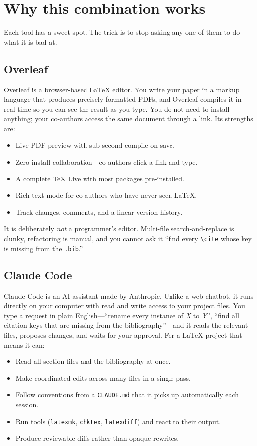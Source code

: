 \section{Why this combination works}
\label{sec:why}

Each tool has a sweet spot. The trick is to stop asking any one of them to do what it is bad at.

\subsection{Overleaf}
Overleaf is a browser-based \LaTeX{} editor. You write your paper in a markup language that produces precisely formatted PDFs, and Overleaf compiles it in real time so you can see the result as you type. You do not need to install anything; your co-authors access the same document through a link. Its strengths are:
\begin{itemize}[leftmargin=*]
  \item Live PDF preview with sub-second compile-on-save.
  \item Zero-install collaboration---co-authors click a link and type.
  \item A complete TeX Live with most packages pre-installed.
  \item Rich-text mode for co-authors who have never seen \LaTeX{}.
  \item Track changes, comments, and a linear version history.
\end{itemize}

It is deliberately \emph{not} a programmer's editor. Multi-file search-and-replace is clunky, refactoring is manual, and you cannot ask it ``find every \verb|\cite| whose key is missing from the \texttt{.bib}.''

\subsection{Claude Code}
Claude Code is an AI assistant made by Anthropic. Unlike a web chatbot, it runs directly on your computer with read and write access to your project files. You type a request in plain English---``rename every instance of \emph{X} to \emph{Y}'', ``find all citation keys that are missing from the bibliography''---and it reads the relevant files, proposes changes, and waits for your approval. For a \LaTeX{} project that means it can:
\begin{itemize}[leftmargin=*]
  \item Read all section files and the bibliography at once.
  \item Make coordinated edits across many files in a single pass.
  \item Follow conventions from a \verb|CLAUDE.md| that it picks up automatically each session.
  \item Run tools (\texttt{latexmk}, \texttt{chktex}, \texttt{latexdiff}) and react to their output.
  \item Produce reviewable diffs rather than opaque rewrites.
\end{itemize}

